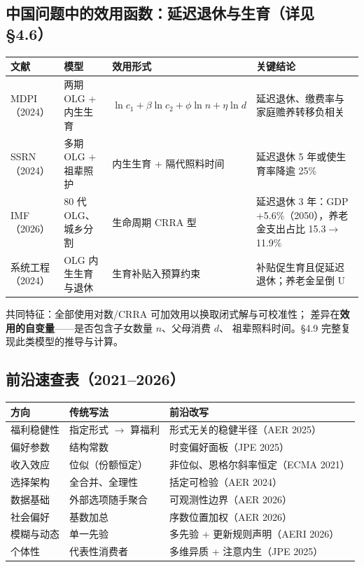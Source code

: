 \subsection{中国问题中的效用函数：延迟退休与生育（详见 \S 4.6）}

\begin{center}
\footnotesize
\setlength{\tabcolsep}{4pt}
\begin{tabular}{p{1.9cm}p{3.0cm}p{4.6cm}p{4.6cm}}
\toprule
文献 & 模型 & 效用形式 & 关键结论 \\
\midrule
MDPI（2024） & 两期 OLG + 内生生育 & $\ln c_1+\beta\ln c_2+\phi\ln n+\eta\ln d$ & 延迟退休、缴费率与家庭赡养转移负相关 \\
SSRN（2024） & 多期 OLG + 祖辈照护 & 内生生育 + 隔代照料时间 & 延迟退休 5 年或使生育率降逾 25\% \\
IMF（2026） & 80 代 OLG、城乡分割 & 生命周期 CRRA 型 & 延迟退休 3 年：GDP +5.6\%（2050），养老金支出占比 15.3$\to$11.9\% \\
系统工程（2024） & OLG 内生生育与退休 & 生育补贴入预算约束 & 补贴促生育且促延迟退休；养老金呈倒 U \\
\bottomrule
\end{tabular}
\end{center}
共同特征：全部使用对数/CRRA 可加效用以换取闭式解与可校准性；
差异在\textbf{效用的自变量}——是否包含子女数量 $n$、父母消费 $d$、
祖辈照料时间。§4.9 完整复现此类模型的推导与计算。

\subsection{前沿速查表（2021--2026）}

\begin{center}
\small
\begin{tabular}{lll}
\toprule
方向 & 传统写法 & 前沿改写 \\
\midrule
福利稳健性 & 指定形式 $\to$ 算福利 & 形式无关的稳健半径（AER 2025） \\
偏好参数 & 结构常数 & 时变偏好面板（JPE 2025） \\
收入效应 & 位似（份额恒定） & 非位似、恩格尔斜率恒定（ECMA 2021） \\
选择架构 & 全合并、全理性 & 括定可检验（AER 2024） \\
数据基础 & 外部选项随手聚合 & 可观测性边界（AER 2026） \\
社会偏好 & 基数加总 & 序数位置加权（AER 2026） \\
模糊与动态 & 单一先验 & 多先验 + 更新规则声明（AERI 2026） \\
个体性 & 代表性消费者 & 多维异质 + 注意内生（JPE 2025） \\
\bottomrule
\end{tabular}
\end{center}
